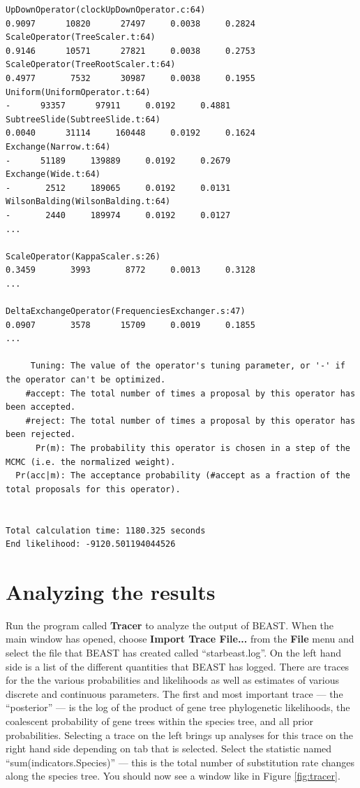 \documentclass{article}
\begin{document}
{\begin{verbatim}
UpDownOperator(clockUpDownOperator.c:64)                                0.9097      10820      27497     0.0038     0.2824 
ScaleOperator(TreeScaler.t:64)                                          0.9146      10571      27821     0.0038     0.2753 
ScaleOperator(TreeRootScaler.t:64)                                      0.4977       7532      30987     0.0038     0.1955 
Uniform(UniformOperator.t:64)                                                -      93357      97911     0.0192     0.4881 
SubtreeSlide(SubtreeSlide.t:64)                                         0.0040      31114     160448     0.0192     0.1624 
Exchange(Narrow.t:64)                                                        -      51189     139889     0.0192     0.2679 
Exchange(Wide.t:64)                                                          -       2512     189065     0.0192     0.0131 
WilsonBalding(WilsonBalding.t:64)                                            -       2440     189974     0.0192     0.0127 
...

ScaleOperator(KappaScaler.s:26)                                         0.3459       3993       8772     0.0013     0.3128 
...

DeltaExchangeOperator(FrequenciesExchanger.s:47)                        0.0907       3578      15709     0.0019     0.1855 
...

     Tuning: The value of the operator's tuning parameter, or '-' if the operator can't be optimized.
    #accept: The total number of times a proposal by this operator has been accepted.
    #reject: The total number of times a proposal by this operator has been rejected.
      Pr(m): The probability this operator is chosen in a step of the MCMC (i.e. the normalized weight).
  Pr(acc|m): The acceptance probability (#accept as a fraction of the total proposals for this operator).


Total calculation time: 1180.325 seconds
End likelihood: -9120.501194044526
\end{verbatim}}

\section{Analyzing the results}

Run the program called \textbf{Tracer} to analyze the output of BEAST. When the
main window has opened, choose \textbf{Import Trace File...} from the
\textbf{File} menu and select the file that BEAST has created called
``starbeast.log''. On the left hand side is a list of the different quantities
that BEAST has logged. There are traces for the the various probabilities and
likelihoods as well as estimates of various discrete and continuous parameters.
The first and most important trace --- the ``posterior'' --- is the log of the
product of gene tree phylogenetic likelihoods, the coalescent probability of
gene trees within the species tree, and all prior probabilities.
Selecting a trace on the left brings up analyses for this trace on the right
hand side depending on tab that is selected. Select the statistic named
``sum(indicators.Species)'' --- this is the total number of substitution rate
changes along the species tree. You should now see a window like in Figure
\ref{fig:tracer}.
\end{document}
